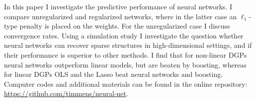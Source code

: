 In this paper I investigate the predictive performance of neural networks. I compare
unregularized and regularized networks, where in the latter case an $\ell_1$-type
penalty is placed on the weights. For the unregularized case I discuss convergence
rates. Using a simulation study I investigate the question whether neural networks can
recover sparse structures in high-dimensional settings, and if their performance is
superior to other methods. I find that for non-linear DGPs neural networks outperform
linear models, but are beaten by boosting, whereas for linear DGPs OLS and the Lasso
beat neural networks and boosting. Computer codes and additional materials can be found
in the online repository: \url{https://github.com/timmens/neural-net}.
